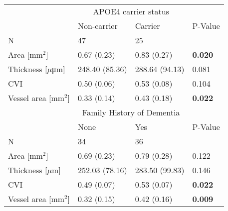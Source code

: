 \begin{tabular}{llll}
\toprule
 & \multicolumn{2}{c}{APOE4 carrier status} &  \\
 \cmidrule(l){2-3}
 & Non-carrier & Carrier & P-Value \\
 \midrule
N & 47 & 25 &  \\
Area [mm$^2$] & 0.67 (0.23) & 0.83 (0.27) & \textbf{0.020} \\
Thickness [$\mu$μm] & 248.40 (85.36) & 288.64 (94.13) & 0.081 \\
\acrshort{CVI} & 0.50 (0.06) & 0.53 (0.08) & 0.104 \\
Vessel area [mm$^2$] & 0.33 (0.14) & 0.43 (0.18) & \textbf{0.022} \\
\midrule
 & \multicolumn{2}{c}{Family History of Dementia} &  \\
 \cmidrule(l){2-3}
 & None & Yes & P-Value \\
 \midrule
N & 34 & 36 &  \\
Area [mm$^2$] & 0.69 (0.23) & {0.79 (0.28)} & 0.122 \\
Thickness [$\mu$m] & 252.03 (78.16) & 283.50 (99.83) & 0.146 \\
\acrshort{CVI} & 0.49 (0.07) & 0.53 (0.07) & \textbf{0.022} \\
Vessel area [mm$^2$] & 0.32 (0.15) & 0.42 (0.16) & \textbf{0.009} \\
\bottomrule
\end{tabular}
